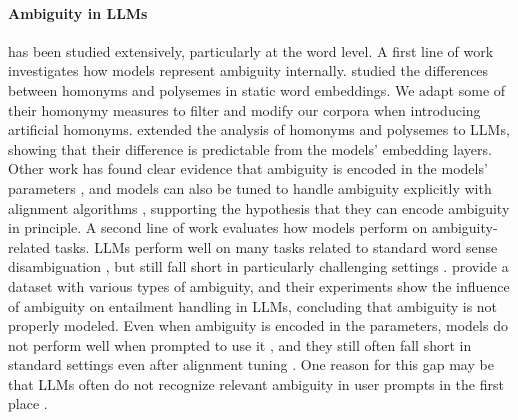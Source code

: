 \documentclass[final]{clv2025}
\begin{document}
\paragraph{Ambiguity in LLMs} has been studied extensively, particularly at the word level. A first line of work investigates how models represent ambiguity internally. \citet{https://doi.org/10.1111/cogs.12943} studied the differences between homonyms and polysemes in static word embeddings. We adapt some of their homonymy measures to filter and modify our corpora when introducing artificial homonyms. \citet{haber-poesio-2024-polysemy,haber-poesio-2021-patterns-polysemy} extended the analysis of homonyms and polysemes to LLMs, showing that their difference is predictable from the models' embedding layers. Other work has found clear evidence that ambiguity is encoded in the models' parameters \cite{park-kim-2025-llms}, and models can also be tuned to handle ambiguity explicitly with alignment algorithms \cite{kim-etal-2024-aligning}, supporting the hypothesis that they can encode ambiguity in principle.
A second line of work evaluates how models perform on ambiguity-related tasks. LLMs perform well on many tasks related to standard word sense disambiguation \cite{sumanathilaka-etal-2024-llms}, but still fall short in particularly challenging settings \cite{gehring-roth-2025-ambistory}. \citet{liu-etal-2023-afraid} provide a dataset with various types of ambiguity, and their experiments show the influence of ambiguity on entailment handling in LLMs, concluding that ambiguity is not properly modeled. Even when ambiguity is encoded in the parameters, models do not perform well when prompted to use it \cite{karamolegkou-etal-2025-trick}, and they still often fall short in standard settings even after alignment tuning \cite{kim-etal-2024-aligning}. One reason for this gap may be that LLMs often do not recognize relevant ambiguity in user prompts in the first place \citep{zhang-etal-2024-clamber}.

\end{document}
